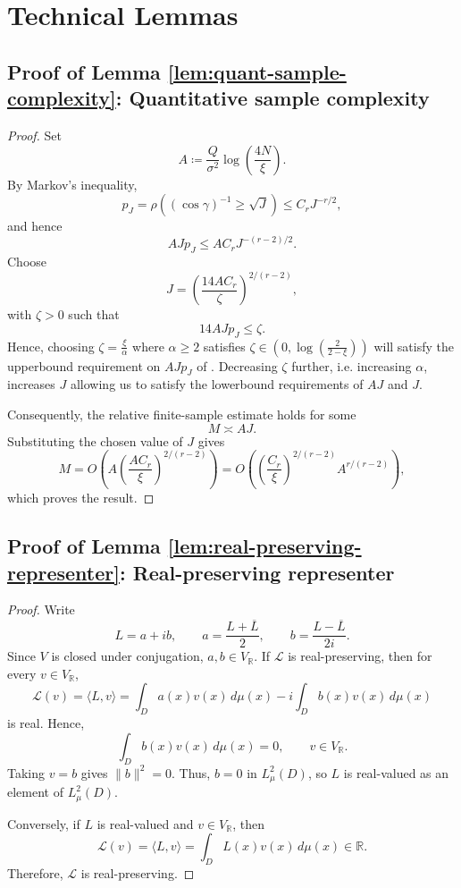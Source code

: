 \documentclass[10pt,dvipsnames]{amsart}
\begin{document}
\section{Technical Lemmas}
\label{app:lemmas}

\subsection{Proof of Lemma \ref{lem:quant-sample-complexity}: Quantitative sample complexity}
\label{app:quant-sample-complexity}
\quantSampleComplexity*
\begin{proof}
Set
\[
    A
    \coloneqq
    \frac{Q}{\sigma^2}\log\left(\frac{4N}{\xi}\right).
\]
By Markov's inequality,
\[
    p_J
    =
    \rho\left(
        (\cos\gamma)^{-1}\geq\sqrt J
    \right)
    \leq
    C_rJ^{-r/2},
\]
and hence
\[
    AJp_J
    \leq
    AC_rJ^{-(r-2)/2}.
\]
Choose
\[
    J
    =
    \left(\frac{14 AC_r}{\zeta}\right)^{2/(r-2)},
\]
with $\zeta > 0$ such that 
\[
    14 AJp_J
    \leq
    \zeta.
\]
Hence, choosing $\zeta = \frac{\xi}{\alpha}$ where $\alpha\geq2$ satisfies $\zeta \in \left(0, \log\left(\frac{2}{2-\xi}\right)\right)$ will satisfy the 
upperbound requirement on $A J p_J$ of .
Decreasing $\zeta$ further, i.e. increasing $\alpha$, increases $J$ allowing us to satisfy the lowerbound 
requirements of $A J$ and $J$.

Consequently, the relative finite-sample estimate holds for some
\[
    M
    \asymp
    AJ.
\]
Substituting the chosen value of \(J\) gives
\[
    M
    =
    O\left(
        A\left(\frac{AC_r}{\xi}\right)^{2/(r-2)}
    \right)
    =
    O\left(
        \left(\frac{C_r}{\xi}\right)^{2/(r-2)}
        A^{r/(r-2)}
    \right),
\]
which proves the result.
\end{proof}


\subsection{Proof of Lemma \ref{lem:real-preserving-representer}: Real-preserving representer}
\label{app:real-preserving-representer}
\realPreservingRepresenter*
\begin{proof}
Write
\[
    L=a+ib,
    \qquad
    a=\frac{L+\overline L}{2},
    \qquad
    b=\frac{L-\overline L}{2i}.
\]
Since \(V\) is closed under conjugation, \(a,b\in V_{\mathbb R}\).  If
\(\mathcal L\) is real-preserving, then for every \(v\in V_{\mathbb R}\),
\[
    \mathcal L(v)
    =
    \langle L,v\rangle
    =
    \int_D a(x)v(x)\,d\mu(x)
    -
    i\int_D b(x)v(x)\,d\mu(x)
\]
is real.  Hence,
\[
    \int_D b(x)v(x)\,d\mu(x)=0,
    \qquad v\in V_{\mathbb R}.
\]
Taking \(v=b\) gives \(\|b\|^2=0\).  Thus, \(b=0\) in \(L^2_\mu(D)\), so
\(L\) is real-valued as an element of \(L^2_\mu(D)\).

Conversely, if \(L\) is real-valued and \(v\in V_{\mathbb R}\), then
\[
    \mathcal L(v)
    =
    \langle L,v\rangle
    =
    \int_D L(x)v(x)\,d\mu(x)
    \in \mathbb R .
\]
Therefore, \(\mathcal L\) is real-preserving.
\end{proof}
\end{document}
